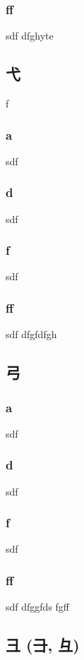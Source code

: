 \subsubsection{ff}sdf
\setcounter{subsss}{\value{subsubsection}} dfghyte
\subsection{\ene  弋} \label{cincuentayseiss}f

\subsubsection{a}sdf
\subsubsection{d}sdf
\subsubsection{f}sdf
\subsubsection{ff}sdf
\setcounter{subsss}{\value{subsubsection}} dfgfdfgh
\subsection{\ene  弓} \label{cincuentaysietes} 

\subsubsection{a}sdf
\subsubsection{d}sdf
\subsubsection{f}sdf
\subsubsection{ff}sdf
\setcounter{subsss}{\value{subsubsection}} dfggfds fgff
\subsection{\ene  彐 (⺕, 彑)} \label{cincuentasyochos}  

